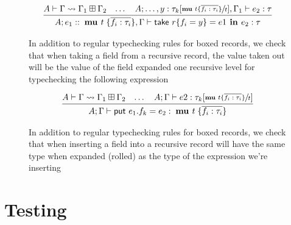 \begin{figure}
    \centering
    \begin{align*}
        \infer{
            A; e_1 ::\; \textbf{mu } t\; \{ \overline{f_i : \tau_i} \}, \Gamma \vdash \textsf{take } r \{ f_i = y \} = e1 \textbf{ in } e_2 : \tau
        }{
            A \vdash \Gamma \rightsquigarrow \Gamma_1 \boxplus \Gamma_2
            &
            \dots
            &
            A; \dots, y : \tau_k[\sfrac{ \textbf{mu } t \{\overline{f_i : \tau_i} \}}{t}], \Gamma_1 \vdash e_2 : \tau
        }
    \end{align*}
    \caption{In addition to regular typechecking rules for boxed records, we check that when taking a field from a recursive
             record, the value taken out will be the value of the field expanded one recursive level for typechecking the following expression}
    \label{fig:automaticunroll}
\end{figure}

\begin{figure}
    \centering
    \begin{align*}
        \infer{
            A;\Gamma \vdash \textsf{put } e_1.f_k  = e_2 : \; \textbf{mu } t\; \{ \overline{f_i : \tau_i} \}
        }{
            A \vdash \Gamma \rightsquigarrow \Gamma_1 \boxplus \Gamma_2
            &
            \dots
            &
            A;\Gamma \vdash e2 : \tau_k[\sfrac{ \textbf{mu } t \{\overline{f_i : \tau_i} \}}{t}]
        }
    \end{align*}
    \caption{In addition to regular typechecking rules for boxed records, we check that when inserting a field into a recursive
             record will have the same type when expanded (rolled) as the type of the expression we're inserting}
    \label{fig:automaticroll}
\end{figure}

\section{Testing}

